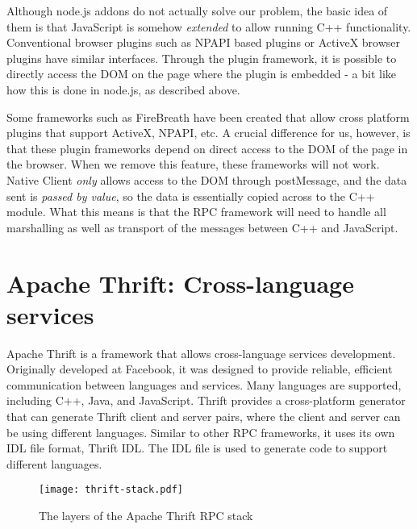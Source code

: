 Although node.js addons do not actually solve our problem, the basic idea of them is that JavaScript is somehow \emph{extended} to allow running C++ functionality. Conventional browser plugins such as NPAPI based plugins or ActiveX browser plugins have similar interfaces. Through the plugin framework, it is possible to directly access the DOM on the page where the plugin is embedded - a bit like how this is done in node.js, as described above. 

Some frameworks such as FireBreath \cite{firebreath} have been created that allow cross platform plugins that support ActiveX, NPAPI, etc. A crucial difference for us, however, is that these plugin frameworks depend on direct access to the DOM of the page in the browser. When we remove this feature, these frameworks will not work. Native Client \emph{only} allows access to the DOM through postMessage, and the data sent is \emph{passed by value}, so the data is essentially copied across to the C++ module. What this means is that the RPC framework will need to handle all marshalling as well as transport of the messages between C++ and JavaScript.




\section{Apache Thrift: Cross-language services} %
\label{sec:apache_thrift_cross_language_services}
Apache Thrift is a framework that allows cross-language services development. Originally developed at Facebook, it was designed to provide reliable, efficient communication between languages and services. Many languages are supported, including C++, Java, and JavaScript. Thrift provides a cross-platform generator that can generate Thrift client and server pairs, where the client and server can be using different languages. Similar to other RPC frameworks, it uses its own IDL file format, Thrift IDL. The IDL file is used to generate code to support different languages.

\begin{figure}
    \centering
    \texttt{[image: thrift-stack.pdf]} 
    \caption{The layers of the Apache Thrift RPC stack}
    \label{fig:thrift-stack}
\end{figure}

